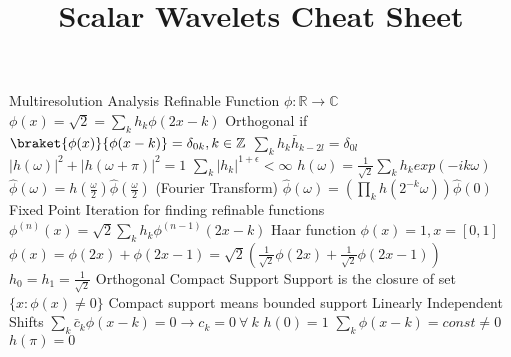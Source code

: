 \documentclass[14pt]{extarticle}
\title{Scalar Wavelets Cheat Sheet}
\begin{document}
	\maketitle

	\begin{outline}		
		\1	Multiresolution Analysis
			\2	Refinable Function $\phi : \mathbb{R} \rightarrow \mathbb{C}$
				\3	$\phi(x) = \sqrt{2} = \sum_{k} h_k\phi(2x - k)$
				\3	Orthogonal if $\braket{\phi(x)}{\phi(x - k)} = \delta_{0k}, k \in \mathbb{Z}$
					\4	$\sum_k h_k \bar{h}_{k-2l} = \delta_{0l}$
					\4	$|h(\omega)|^2 + |h(\omega + \pi)|^2 = 1$
				\3	$\sum_k |h_k|^{1 + \epsilon} < \infty$
				\3	$h(\omega) = \frac{1}{\sqrt{2}}\sum_k h_k exp(-ik\omega)$
				\3	$\hat{\phi}(\omega) = h(\frac{\omega}{2})\hat{\phi}(\frac{\omega}{2})$ (Fourier Transform)
				\3	$\hat{\phi}(\omega) = (\prod_k h(2^{-k}\omega) ) \hat{\phi}(0)$
				\3	Fixed Point Iteration for finding refinable functions
					\4	$\phi^{(n)}(x) = \sqrt{2}\sum_k h_k \phi^{(n-1)}(2x - k)$
			\2	Haar function
				\3	$\phi(x) = 1, x = [0,1]$
				\3	$\phi(x) = \phi(2x) + \phi(2x-1) = \sqrt{2}(\frac{1}{\sqrt{2}}\phi(2x) + \frac{1}{\sqrt{2}}\phi(2x-1))$
				\3	$h_0 = h_1 = \frac{1}{\sqrt{2}}$
				\3	Orthogonal
			\2	Compact Support
				\3	Support is the closure of set $\{x : \phi(x) \ne 0\}$
				\3	Compact support means bounded support
				\3	Linearly Independent Shifts
					\4	$\sum_k \bar{c}_k \phi(x - k) = 0 \rightarrow c_k = 0~\forall~k$
				\3	$h(0) = 1$
				\3	$\sum_k \phi(x - k) = const \ne 0$
				\3	$h(\pi) = 0$
			

\end{outline}
\end{document}
